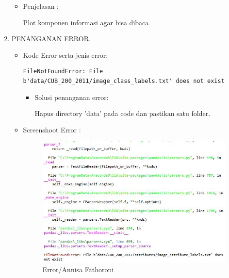 \begin{enumerate}
\begin{itemize}
\item Penjelasan :

Plot komponen informasi agar bisa dibaca

\end{itemize}

\item PENANGANAN ERROR.
\begin{itemize}
\item Kode Error serta jenis error:
 
\begin{verbatim}
FileNotFoundError: File b'data/CUB_200_2011/image_class_labels.txt' does not exist
\end{verbatim}

\begin{itemize}
\item Solusi penanganan error:

Hapus directory 'data' pada code dan pastikan satu folder.

\end{itemize}
\item Screenshoot Error :

\begin{figure}[ht]
\centering
\includegraphics[scale=0.6]{figures/Error.jpg}
\caption{Error/Annisa Fathoroni}
\label{contoh}
\end{figure}

\end{itemize}

\end{enumerate}


